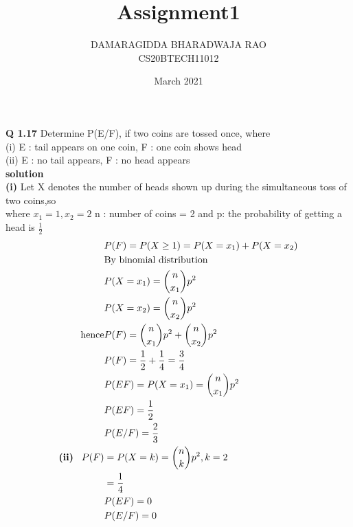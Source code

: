 \documentclass{article}
\title{Assignment1}
\author{DAMARAGIDDA BHARADWAJA RAO\\CS20BTECH11012}
\date{March 2021}
\begin{document}
\maketitle
\begin{multicols*}{2}
\noindent
\textbf{Q 1.17} Determine P(E/F), if two coins are tossed
once, where\\
(i) E : tail appears on one coin, F : one coin
shows head\\
\vspace{0.5cm}
(ii) E : no tail appears, F : no head appears\\
\textbf{solution}\\
\textbf{(i)} Let X denotes the number of heads shown up during the simultaneous toss of two coins,so \\
where $ x_1 = 1,x_2 = 2 $  n : number of coins = 2 and p: the probability of getting a head is $\frac{1}{2}$
\begin{align*}
&P(F)=P(X\geq 1)=P(X=x_1)+P(X=x_2)\\\
&\text{By binomial distribution}\\
&P(X=x_1)=\binom{n}{x_1} p ^2\\
&P(X=x_2)=\binom{n}{x_2} p ^2\\
\text{hence} &P(F) = \binom{n}{x_1} p ^2 + \binom{n}{x_2} p ^2\\
&P(F) = \frac{1}{2} + \frac{1}{4} = \frac{3}{4}\\
&P(EF) = P(X=x_1)=\binom{n}{x_1} p ^2\\
&P(EF) = \frac{1}{2}\\
&P(E/F) = \frac{2}{3}\\
\textbf{(ii)}\hspace{0.3cm}P(F) &=P(X=k)= \binom{n}{k} p^2, k = 2\\
& = \frac{1}{4}\\
&P(EF) = 0\\
&P(E/F) = 0
\end{align*}
\end{multicols*}
\end{document}
